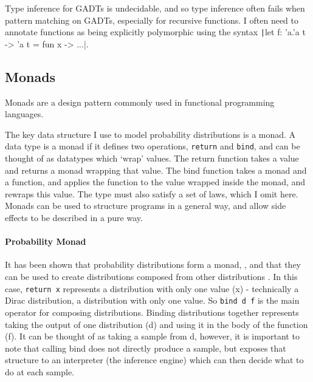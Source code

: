 Type inference for GADTs is undecidable, and so type inference often fails when pattern matching on GADTs, especially for recursive functions. I often need to annotate functions as being explicitly polymorphic using the syntax \texttt|let f: 'a.'a t -> 'a t = fun x -> ...|.
	
\subsection{Monads}
Monads are a design pattern commonly used in functional programming languages.
	
The key data structure I use to model probability distributions is a monad. A data type is a monad if it defines two operations, \texttt{return} and \texttt{bind}, and can be thought of as datatypes which `wrap' values. The return function takes a value and returns a monad wrapping that value. The bind function takes a monad and a function, and applies the function to the value wrapped inside the monad, and rewraps this value. The type must also satisfy a set of laws, which I omit here\cite{wadler1990comprehending}. Monads can be used to structure programs in a general way, and allow side effects to be described in a pure way.
	
\paragraph{Probability Monad}
It has been shown that probability distributions form a monad, \cite{giry1982categorical, jones1989probabilistic}, and that they can be used to create distributions composed from other distributions \cite{ramsey2002stochastic}. In this case, \texttt{return x} represents a distribution with only one value (x) - technically a Dirac distribution, a distribution with only one value. So \texttt{bind d f} is the main operator for composing distributions. Binding distributions together represents taking the output of one distribution (d) and using it in the body of the function (f). It can be thought of as taking a sample from d, however, it is important to note that calling bind does not directly produce a sample, but exposes that structure to an interpreter (the inference engine) which can then decide what to do at each sample.
	
	

